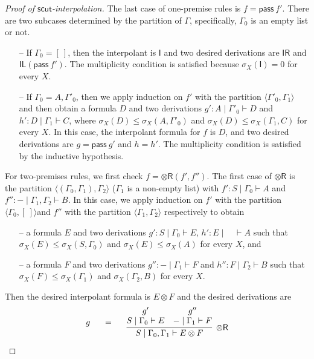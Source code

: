 \documentclass[sn-mathphys-num]{sn-jnl}%
\newcommand{\GG}{\Gamma}
\newcommand{\vd}{\vdash}
\newcommand{\tr}{\otimes\mathsf{R}}
\newcommand{\pass}{\mathsf{pass}}
\newcommand{\unitl}{\mathsf{IL}}
\newcommand{\unitr}{\mathsf{IR}}
\newcommand{\ot}{\otimes}
\newcommand{\unit}{\mathsf{I}}
\newcommand{\mf}[1]{\mathsf{#1}}
\newcommand{\gs}[1]{\sigma_{X} (#1)}
\theoremstyle{thmstyleone}%
\theoremstyle{thmstyletwo}%
\theoremstyle{thmstylethree}%
\begin{document}
\begin{proof}[Proof of $\mf{scut}$-interpolation]
The last case of one-premise rules is $ f = \pass \ f'$.
There are two subcases determined by the partition of $\GG$, specifically, $\GG_0$ is an empty list or not.
\begin{itemize}
  \item[--] If $\GG_0 = [\ ]$, then the interpolant is $\unit$ and two desired derivations are $\unitr$ and $\unitl (\pass \ f')$.
The multiplicity condition is satisfied because $\gs{\unit} = 0$ for every $X$.
  \item[--] If $\GG_0 = A, \GG'_0$, then we apply induction on $f'$ with the partition $\langle \GG'_0, \GG_1 \rangle$ and then obtain a formula $D$ and two derivations $g' : A \mid \GG'_0 \vd D$ and $h' : D \mid \GG_1 \vd C$, where $\gs{D} \leq \gs{A, \GG'_0} $ and $ \gs{D} \leq \gs{\GG_1, C}$ for every $X$.
In this case, the interpolant formula for $f$ is $D$, and two desired derivations are $g = \pass \ g'$ and $h = h'$.
The multiplicity condition is satisfied by the inductive hypothesis.
\end{itemize} 
For two-premises rules, we first check $f = \tr (f',f'')$.
The first case of $\tr$ is the partition $\langle (\GG_0, \GG_1), \GG_2 \rangle$ ($\GG_1$ is a non-empty list) with $f' : S \mid \GG_0 \vd A$ and $f'': {-} \mid \GG_1, \GG_2 \vd B$.
In this case, we apply induction on $f'$ with the partition $\langle \GG_0 , [\ ] \rangle $and $f''$ with the partition $\langle \GG_1 , \GG_2 \rangle$ respectively to obtain
\begin{itemize}
  \item[--] a formula $E$ and two derivations $g' : S \mid \GG_0 \vd E$, $h' : E \mid \quad \vd A$ such that $\gs{E} \leq \gs{S, \GG_0} $ and $ \gs{E} \leq \gs{A}$ for every $X$, and
  \item[--] a formula $F$ and two derivations $g'' : {-} \mid \GG_1 \vd F$ and $h'' : F \mid \GG_2 \vd B$ such that $\gs{F} \leq \gs{\GG_1} $ and $\gs{\GG_2, B}$ for every $X$.
\end{itemize}
Then the desired interpolant formula is $E \ot F$ and the desired derivations are
\begin{displaymath}
  \begin{array}{c}
  \begin{array}{c}
    g
  \end{array}
  \quad
  =
  \quad
  \begin{array}{c}
    \infer[\tr]{S \mid \GG_0 , \GG_1 \vd E \ot F}{
      \deduce{S \mid \GG_0 \vd E}{g'}
      &
      \deduce{{-} \mid \GG_1 \vd F}{g''}
    }
  \end{array}

\end{array}
\end{displaymath}
\end{proof}
\end{document}
